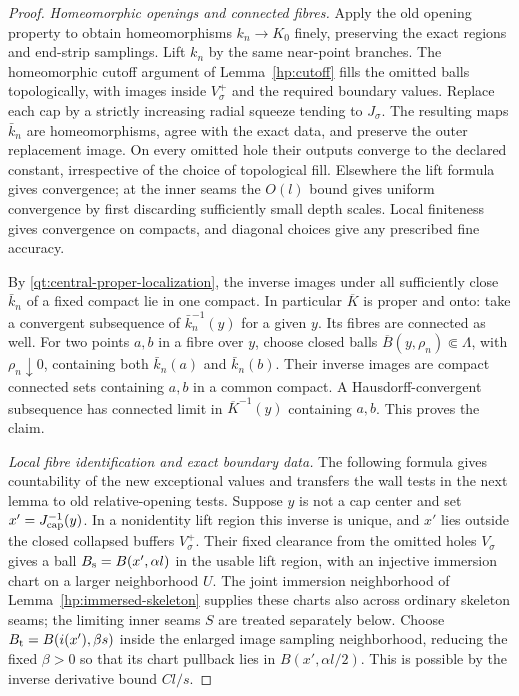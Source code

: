 \begin{proof}
\emph{Homeomorphic openings and connected fibres.}
Apply the old opening property to
obtain homeomorphisms $k_n\to K_0$ finely, preserving the exact
regions and end-strip samplings.  Lift $k_n$ by the same near-point
branches.  The homeomorphic cutoff argument of
Lemma~\ref{hp:cutoff} fills the omitted balls topologically, with
images inside $V_{\sigma}^+$ and the required boundary values.  Replace
each cap by a strictly increasing radial squeeze tending to $J_{\sigma}$.
The resulting maps $\bar k_n$ are homeomorphisms, agree with the
exact data, and preserve the outer replacement image.
On every omitted hole their outputs converge to the declared
constant, irrespective of the choice of topological fill.  Elsewhere
the lift formula gives convergence; at the inner seams the $O(l)$
bound gives uniform convergence by first discarding sufficiently
small depth scales.  Local finiteness gives convergence on compacts,
and diagonal choices give any prescribed fine accuracy.

By \eqref{qt:central-proper-localization}, the inverse images under
all sufficiently close $\bar k_n$ of a fixed compact lie in one
compact.  In particular $\overline K$ is proper and onto: take a
convergent subsequence of $\bar k_n^{-1}(y)$ for a given $y$.
Its fibres are connected as well.  For two points $a,b$ in a fibre
over $y$, choose closed balls $\overline B(y,\rho_n)\Subset\Lambda$,
with $\rho_n\downarrow0$, containing both $\bar k_n(a)$ and
$\bar k_n(b)$.  Their inverse images are compact connected sets
containing $a,b$ in a common compact.  A Hausdorff-convergent
subsequence has connected limit in $\overline K^{-1}(y)$ containing
$a,b$.  This proves the claim.

\emph{Local fibre identification and exact boundary data.}
The following formula gives countability of the new exceptional
values and transfers the wall tests in the next lemma to old
relative-opening tests.  Suppose $y$ is not a cap center and set
$x'=J_{\rm cap}^{-1}(y)$.  In a nonidentity lift region this inverse
is unique, and $x'$ lies outside the closed collapsed buffers
$V_\sigma^+$.  Their fixed clearance from the omitted holes
$V_\sigma$ gives a ball
$B_{\rm s}=B(x',\alpha l)$ in the usable lift region, with an
injective immersion chart on a larger neighborhood $U$.  The joint
immersion neighborhood of Lemma~\ref{hp:immersed-skeleton} supplies
these charts also across ordinary skeleton seams; the limiting inner
seams $S$ are treated separately below.  Choose
$B_{\rm t}=B(i(x'),\beta s)$ inside the enlarged image sampling
neighborhood, reducing the fixed $\beta>0$ so that its chart
pullback lies in $B(x',\alpha l/2)$.  This is possible by the
inverse derivative bound $C l/s$.


\end{proof}
